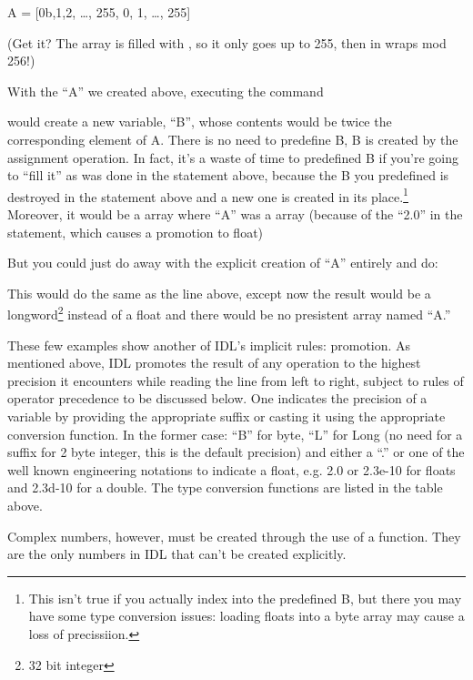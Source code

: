      A = [0b,1,2, \ldots, 255, 0, 1, \ldots, 255]

  (Get it? The array is filled with , so it only goes up
  to 255, then in wraps mod 256!)

  With the ``A'' we created above, executing the command 


  would create a new variable, ``B'', whose contents would be twice the
  corresponding element of A.  There is no need to predefine B, B is
  created by the assignment operation.  In fact, it's a waste of time to
  predefined B if you're going to ``fill it'' as was done in the
  statement above, because the B you predefined is destroyed in the
  statement above and a new one is created in its place.\footnote{This isn't true
  if you actually index into the predefined B, but there you may have
  some type conversion issues: loading floats into a byte array may
  cause a loss of precissiion.} Moreover, it would be a 
  array where ``A'' was a  array (because of the ``2.0'' in
  the statement, which causes a promotion to float) 

  But you could just do away with the explicit creation of ``A''
  entirely and do:


  This would do the same as the line above, except now the result
  would be a longword\footnote{32 bit integer} instead of a float and
  there would be no presistent array named ``A.''

  These few examples show another of IDL's implicit rules:
  promotion. As mentioned above, IDL promotes the result of any
  operation to the highest precision it encounters while reading the
  line from left to right, subject to rules of operator precedence to
  be discussed below. One indicates the precision of a variable by
  providing the appropriate suffix or casting it using the appropriate
  conversion function. In the former case: ``B'' for byte, ``L'' for
  Long (no need for a suffix for 2 byte integer, this is the default
  precision) and either a ``.''  or one of the well known engineering
  notations to indicate a float, e.g. 2.0 or 2.3e-10 for floats and
  2.3d-10 for a double. The type conversion functions are listed in
  the table above.


  Complex numbers, however, must be created through the use of a
  function. They are the only numbers in IDL that can't be created
  explicitly.

